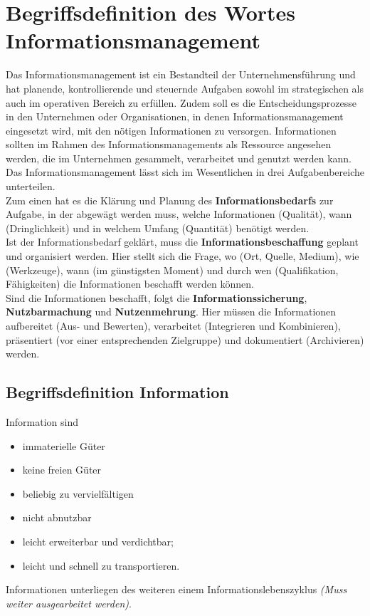 \section{Begriffsdefinition des Wortes Informationsmanagement}
Das Informationsmanagement ist ein Bestandteil der Unternehmensführung und hat planende, kontrollierende und steuernde Aufgaben sowohl im strategischen als auch im operativen Bereich zu erfüllen. Zudem soll es die Entscheidungsprozesse in den Unternehmen oder Organisationen, in denen Informationsmanagement eingesetzt wird, mit den nötigen Informationen zu versorgen. Informationen sollten im Rahmen des Informationsmanagements als Ressource angesehen werden, die im Unternehmen gesammelt, verarbeitet und genutzt werden kann.\\

Das Informationsmanagement lässt sich im Wesentlichen in drei Aufgabenbereiche unterteilen. \\

Zum einen hat es die Klärung und Planung des \textbf{Informationsbedarfs} zur Aufgabe, in der abgewägt werden muss, welche Informationen (Qualität), wann (Dringlichkeit) und in welchem Umfang (Quantität) benötigt werden.\\


Ist der Informationsbedarf geklärt, muss die \textbf{Informationsbeschaffung} geplant und organisiert werden. Hier stellt sich die Frage, wo (Ort, Quelle, Medium), wie (Werkzeuge), wann (im günstigsten Moment) und durch wen (Qualifikation, Fähigkeiten) die Informationen beschafft werden können.\\


Sind die Informationen beschafft, folgt die \textbf{Informationssicherung}, \textbf{Nutzbarmachung} und \textbf{Nutzenmehrung}. Hier müssen die Informationen aufbereitet (Aus- und Bewerten), verarbeitet (Integrieren und Kombinieren), präsentiert (vor einer entsprechenden Zielgruppe) und dokumentiert (Archivieren) werden.\\

\subsection{Begriffsdefinition Information}
Information sind
\begin{itemize}
	\item immaterielle Güter
	\item keine freien Güter
	\item beliebig zu vervielfältigen
	\item nicht abnutzbar
	\item leicht erweiterbar und verdichtbar;
	\item leicht und schnell zu transportieren.
\end{itemize}

Informationen unterliegen des weiteren einem Informationslebenszyklus \emph{(Muss weiter ausgearbeitet werden)}.